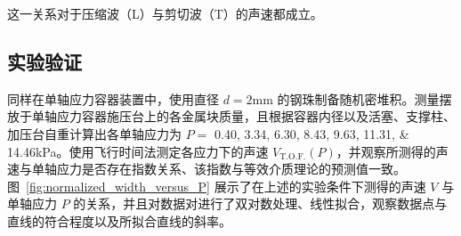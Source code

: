 这一关系对于压缩波（L）与剪切波（T）的声速都成立。


\subsection{实验验证}\label{sec:stress_velocity_relation}

同样在单轴应力容器装置中，使用直径 $d=2\unit{\milli\meter}$ 的钢珠制备随机密堆积。测量摆放于单轴应力容器施压台上的各金属块质量，且根据容器内径以及活塞、支撑柱、加压台自重计算出各单轴应力为 $P=$ \numlist{0.40;3.34;6.30;8.43;9.63;11.31;14.46}\unit{\kilo\pascal}。使用飞行时间法测定各应力下的声速 $V_{\text{T.O.F.}}(P)$，并观察所测得的声速与单轴应力是否存在指数关系、该指数与等效介质理论的预测值一致。图~\ref{fig:normalized_width_versus_P} 展示了在上述的实验条件下测得的声速 $V$ 与单轴应力 $P$ 的关系，并且对数据对进行了双对数处理、线性拟合，观察数据点与直线的符合程度以及所拟合直线的斜率。

